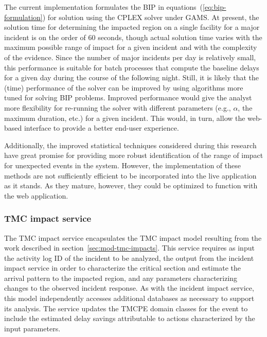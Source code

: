 \documentclass[12pt]{report}
\renewcommand{\fixme}[3][]{#1\xspace}
\newcounter{time}
\newcounter{space}
\begin{document}


The current implementation formulates the \ac{BIP} in
equations~(\ref{eq:bip-formulation}) for solution using the \ac{CPLEX} solver
under \ac{GAMS}.  At present, the solution time for determining the impacted
region on a single facility for a major incident is on the order of 60 seconds,
though actual solution time varies with the maximum possible range of impact for
a given incident and with the complexity of the evidence.  Since the number of
major incidents per day is relatively small, this performance is suitable for
batch processes that compute the baseline delays for a given day during the
course of the following night.  Still, it is likely that the (time) performance
of the solver can be improved by using algorithms more tuned for solving
\ac{BIP} problems.  Improved performance would give the analyst more flexibility
for re-running the solver with different parameters (e.g., $\alpha$, the maximum
duration, etc.) for a given incident.  This would, in turn, allow the web-based
interface to provide a better end-user experience.

Additionally, the improved statistical techniques considered during this
research
have great promise for providing more robust identification of the range of
impact for unexpected events in the system.  However, the implementation of
these methods are not sufficiently efficient to be incorporated into the live
application as it stands.  As they mature, however, they could be optimized to
function with the web application.


\subsubsection{TMC impact service}
\label{sec:tmc-impact-service}
The \ac{TMC} impact service encapsulates the \ac{TMC} impact model
resulting from the work described in
section~\ref{sec:mod-tmc-impacts}.  This service requires as input the
activity log ID of the incident to be analyzed, the output from the
incident impact service in order to characterize the critical section
and estimate the arrival pattern to the impacted region, and any
parameters characterizing changes to the observed incident response.
As with the incident impact service, this model independently accesses
additional databases as necessary to support its analysis.  The
service updates the \ac{TMCPE} domain classes for the event to include
the estimated delay savings attributable to actions characterized by
the input parameters.
\end{document}
